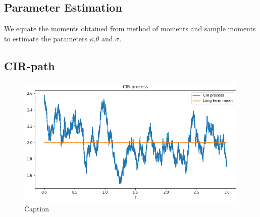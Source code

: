 \subsection{Parameter Estimation}
We equate the moments obtained from method of moments and sample moments to
estimate the parameters $\kappa$,$\theta$ and $\sigma$.

\subsection{CIR-path}

\begin{figure}[!ht]
	\centering
	\includegraphics[width=\textwidth/2]{figs/CIR}
	\caption{Caption}
	\label{fig:cir-process}
\end{figure}

